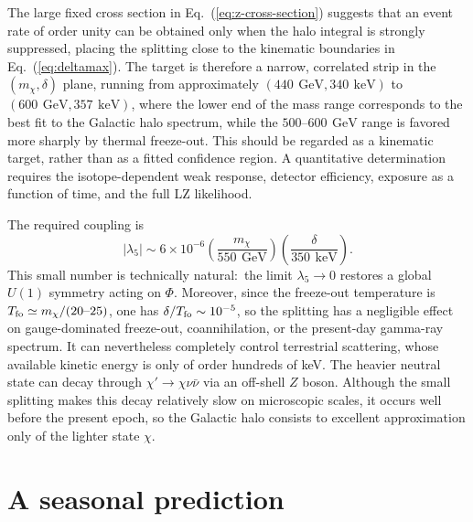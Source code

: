\documentclass[aps,prd,twocolumn,nofootinbib,superscriptaddress]{revtex4-2}
\newcommand{\GeV}{\,\mathrm{GeV}}
\newcommand{\keV}{\,\mathrm{keV}}
\begin{document}
The large fixed cross section in Eq.~(\ref{eq:z-cross-section}) suggests that an event rate of order unity can be obtained only when the halo integral is strongly suppressed, placing the splitting close to the kinematic boundaries in Eq.~(\ref{eq:deltamax}). The target is therefore a narrow, correlated strip in the $(m_\chi,\delta)$ plane, running from approximately $(440~\GeV,340~\keV)$ to $(600~\GeV,357~\keV)$, where the lower end of the mass range corresponds to the best fit to the Galactic halo spectrum, while the $500$--$600~\GeV$ range is favored more sharply by thermal freeze-out. This should be regarded as a kinematic target, rather than as a fitted confidence region. A quantitative determination requires the isotope-dependent weak response, detector efficiency, exposure as a function of time, and the full LZ likelihood.

The required coupling is
%
\begin{equation}
  |\lambda_5| \sim 6 \times 10^{-6} \left(\frac{m_\chi}{550~\GeV}\right) \left(\frac{\delta}{350~\keV}\right).
\label{eq:lambda5}
\end{equation}
%
This small number is technically natural:\ the limit $\lambda_5 \to 0$ restores a global $U(1)$ symmetry acting on $\Phi$. Moreover, since the freeze-out temperature is $T_{\rm fo} \simeq m_\chi/(20\text{--}25)$, one has $\delta/T_{\rm fo}\sim10^{-5}$, so the splitting has a negligible effect on gauge-dominated freeze-out, coannihilation, or the present-day gamma-ray spectrum. It can nevertheless completely control terrestrial scattering, whose available kinetic energy is only of order hundreds of keV. The heavier neutral state can decay through $\chi' \to \chi \nu \bar{\nu}$ via an off-shell $Z$ boson. Although the small splitting makes this decay relatively slow on microscopic scales, it occurs well before the present epoch, so the Galactic halo consists to excellent approximation only of the lighter state $\chi$.


\section{A seasonal prediction}
\end{document}
